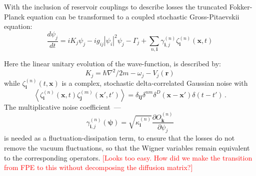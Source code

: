 \documentclass[aps,prl,twocolumn,showpacs,amsmath,amssymb,superscriptaddress]{revtex4-1}
\newcommand{\remark}[1]{\textcolor{red}{{[}#1{]}}}
\begin{document}
{With the inclusion of reservoir couplings to describe losses
the truncated Fokker-Planck equation can be transformed
to a coupled stochastic Gross-Pitaevskii equation:
\begin{equation}
	\frac{d\psi_{j}}{dt} = iK_{j} \psi_{j} - ig_{ij} |\psi_{i}|^{2} \psi_{j} - \Gamma_{j} +
		\sum_{n,\mathbf{i}} \gamma_{\mathbf{i},j}^{(n)} \zeta_{\mathbf{i}}^{(n)} (\mathbf{x},t)
\end{equation}

Here the linear unitary evolution of the wave-function, is described by:
\begin{equation}
	K_{j} = \hbar \nabla^{2}/2m - \omega_{j} - V_{j} \left( \mathbf{r} \right)
\end{equation}
while $\zeta_{\mathbf{i}}^{(n)}(t,\mathbf{x})$ is a complex,
stochastic delta-correlated Gaussian noise with
\begin{equation}
	\left\langle
		\zeta_{\mathbf{i}}^{(n)} (\mathbf{x},t) \zeta_{\mathbf{j}}^{(m)}(\mathbf{x}',t')
	\right\rangle =
	\delta_{\mathbf{ij}} \delta^{nm} \delta^{D} \left(
		\mathbf{x} - \mathbf{x}'
	\right)
	\delta \left( t - t' \right)\,.
\end{equation}
The multiplicative noise coefficient~---
\begin{equation}
	\gamma_{\mathbf{i},j}^{(n)} \left( \boldsymbol{\psi} \right) =
	\sqrt{\kappa_{\mathbf{i}}^{(n)}}
	\frac{\partial O_{\mathbf{k}}^{(n)}}{\partial\psi_{j}}
\end{equation}
is needed as a fluctuation-dissipation term,
to ensure that the losses do not remove the vacuum fluctuations,
so that the Wigner variables remain equivalent to the corresponding operators.
	\remark{Looks too easy. How did we make the transition from FPE to this
	without decomposing the diffusion matrix?}

}
\end{document}
